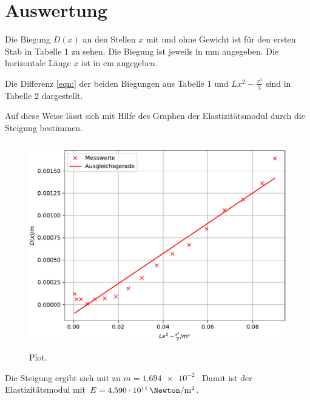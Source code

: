 \section{Auswertung}
\label{sec:Auswertung}

Die Biegung $D(x)$ an den Stellen $x$ mit und ohne Gewicht
ist für den ersten Stab in Tabelle 1 zu sehen. Die Biegung ist %
jeweils in $\si{\mm}$ angegeben.
Die horizontale Länge $x$ ist in $\si{\cm}$ angegeben.


Die Differenz \eqref{eqn:} der beiden Biegungen aus Tabelle 1 %
und $Lx^2-\frac{x^3}{3}$ sind in Tabelle 2 dargestellt. %


Auf diese Weise lässt sich mit Hilfe des Graphen %
der Elastizitätsmodul durch die Steigung bestimmen. %
\begin{figure}
  \centering
  \includegraphics[width=12cm, height=9cm]{./plots/Stange1.pdf}
  \caption{Plot.}
  \label{fig:plot}
\end{figure}
Die Steigung ergibt sich mit %
zu $m = \SI{1.694e-2}{}$. Damit ist der Elastizitätsmodul mit %
$E = \SI[per-mode=fraction]{4.590e11}{\Newton\per\square\metre}$. %





